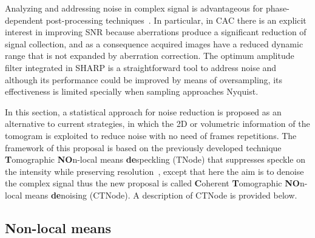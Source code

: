 Analyzing and addressing noise in complex signal is advantageous for phase-dependent post-processing techniques~\cite{Uribe-Patarroyo2020_Noise}. In particular, in CAC there is an explicit interest in improving SNR because aberrations produce a significant reduction of signal collection, and as a consequence acquired images have a reduced dynamic range that is not expanded by aberration correction. The optimum amplitude filter integrated in SHARP is a straightforward tool to address noise and although its performance could be improved by means of oversampling, its effectiveness is limited specially when sampling approaches Nyquist.

In this section, a statistical approach for noise reduction is proposed as an alternative to current strategies, in which the 2D or volumetric information of the tomogram is exploited to reduce noise with no need of frames repetitions. The framework of this proposal is based on the previously developed technique \textbf{T}omographic \textbf{NO}n-local means \textbf{de}speckling (TNode) that suppresses speckle on the intensity while preserving resolution~\cite{Cuartas-Velez2018_Volumetric}, except that here the aim is to denoise the complex signal thus the new proposal is called \textbf{C}oherent \textbf{T}omographic \textbf{NO}n-local means \textbf{de}noising (CTNode). A description of CTNode is provided below.

\subsection{Non-local means}

